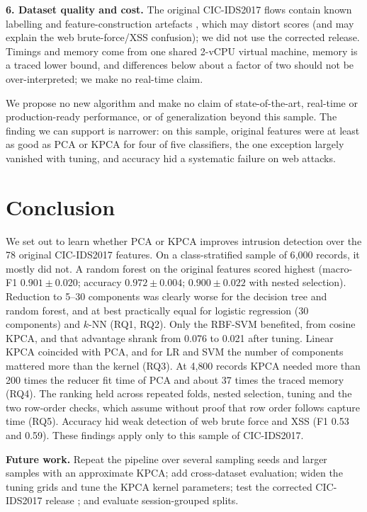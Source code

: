 \documentclass[runningheads]{llncs}
\begin{document}
\textbf{6. Dataset quality and cost.} The original CIC-IDS2017 flows contain known labelling and feature-construction artefacts \cite{engelen2021}, which may distort scores (and may explain the web brute-force/XSS confusion); we did not use the corrected release. Timings and memory come from one shared 2-vCPU virtual machine, memory is a traced lower bound, and differences below about a factor of two should not be over-interpreted; we make no real-time claim.



We propose no new algorithm and make no claim of state-of-the-art, real-time or production-ready performance, or of generalization beyond this sample. The finding we can support is narrower: on this sample, original features were at least as good as PCA or KPCA for four of five classifiers, the one exception largely vanished with tuning, and accuracy hid a systematic failure on web attacks.

\section{Conclusion}
We set out to learn whether PCA or KPCA improves intrusion detection over the 78 original CIC-IDS2017 features. On a class-stratified sample of 6{,}000 records, it mostly did not. A random forest on the original features scored highest (macro-F1 $0.901\pm0.020$; accuracy $0.972\pm0.004$; $0.900\pm0.022$ with nested selection). Reduction to 5--30 components was clearly worse for the decision tree and random forest, and at best practically equal for logistic regression (30 components) and $k$-NN (RQ1, RQ2). Only the RBF-SVM benefited, from cosine KPCA, and that advantage shrank from 0.076 to 0.021 after tuning. Linear KPCA coincided with PCA, and for LR and SVM the number of components mattered more than the kernel (RQ3). At 4{,}800 records KPCA needed more than 200 times the reducer fit time of PCA and about 37 times the traced memory (RQ4). The ranking held across repeated folds, nested selection, tuning and the two row-order checks, which assume without proof that row order follows capture time (RQ5). Accuracy hid weak detection of web brute force and XSS (F1 0.53 and 0.59). These findings apply only to this sample of CIC-IDS2017.

\textbf{Future work.} Repeat the pipeline over several sampling seeds and larger samples with an approximate KPCA; add cross-dataset evaluation; widen the tuning grids and tune the KPCA kernel parameters; test the corrected CIC-IDS2017 release \cite{engelen2021}; and evaluate session-grouped splits.
\end{document}
